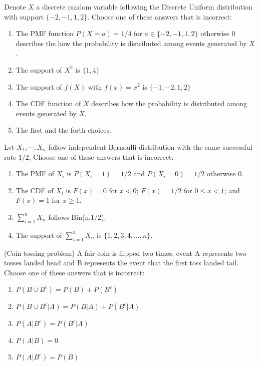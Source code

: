 \documentclass[poll_tutorial_format]{subfiles}
\begin{document}
	
	
	\begin{exercise}
		Denote $X$ a discrete random variable following the Discrete Uniform distribution with support $\{-2,-1,1,2\}$.
		Choose one of these answers that is incorrect: %
		\begin{enumerate}
			\item The PMF function $P(X=a)=1/4$ for $a\in \{-2,-1,1,2\}$ otherwise 0 describes the how the probability is distributed among events generated by $X$. 
			\item The support of $X^2$ is $\{1,4\}$
			\item The support of $f(X)$ with $f(x)=x^2$ is $\{-1,-2,1,2\}$  
			\item The CDF function of $X$ describes how the probability is distributed among events generated by $X$.  
			\item The first and the forth choices.
		\end{enumerate}
	\end{exercise}
	
	
	\begin{exercise}
		Let $X_1,\cdots , X_n$ follow independent Bernoulli distribution with the same successful rate $1/2$, 
		Choose one of these answers that is incorrect: %
		\begin{enumerate}
			\item The PMF of $X_i$ is $P(X_i=1)=1/2$ and $P(X_i=0)=1/2$ otherwise 0.
			\item The CDF of $X_i$ is $F(x)=0$ for $x<0$; $F(x)=1/2$ for $0\leq x <1$; and $F(x)=1$ for $x\geq 1$.  
			\item $\sum_{i=1}^n X_n$ follows  Bin(n,1/2).
			\item The support of $\sum_{i=1}^n X_n$ is $\{1,2,3,4,...,n\}$.
		\end{enumerate}
	\end{exercise}
	
	
	
	\begin{exercise}
		(Coin tossing problem) A fair coin is flipped two times, event A represents two tosses landed head and B represents the event that the first toss landed tail. 
		Choose one of these answers that is incorrect: %
		\begin{enumerate}
			\item $P(B\cup B^c )=P(B)+P(B^c)$
			\item $P(B\cup B^c |A)=P(B|A)+P(B^c|A)$
			\item $P(A|B^c)=P(B^c|A)$
			\item $P(A|B)=0$
			\item $P(A|B^c)=P(B)$
		\end{enumerate}
	\end{exercise}
	
\end{document}
